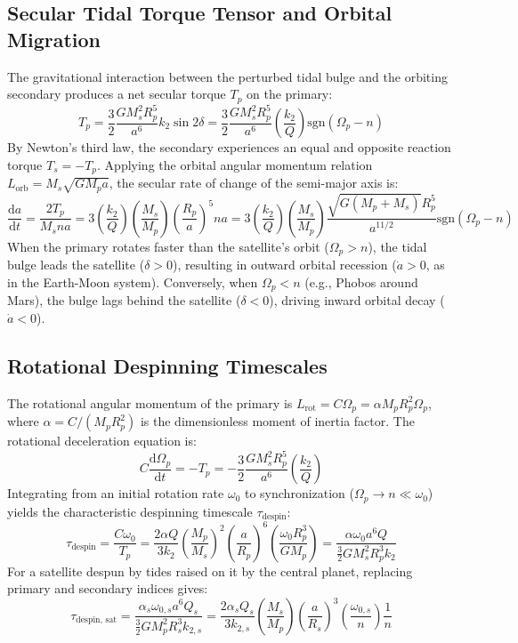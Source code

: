 \documentclass[11pt,a4paper]{article}
\begin{document}
\subsection{Secular Tidal Torque Tensor and Orbital Migration}
The gravitational interaction between the perturbed tidal bulge and the orbiting secondary produces a net secular torque $T_p$ on the primary:
\begin{equation}
T_p = \frac{3}{2} \frac{G M_s^2 R_p^5}{a^6} k_2 \sin 2\delta = \frac{3}{2} \frac{G M_s^2 R_p^5}{a^6} \left(\frac{k_2}{Q}\right) \mathrm{sgn}(\Omega_p - n)
\end{equation}
By Newton's third law, the secondary experiences an equal and opposite reaction torque $T_s = -T_p$. Applying the orbital angular momentum relation $L_{\text{orb}} = M_s \sqrt{G M_p a}$, the secular rate of change of the semi-major axis is:
\begin{equation}
\frac{\mathrm{d}a}{\mathrm{d}t} = \frac{2 T_p}{M_s n a} = 3 \left(\frac{k_2}{Q}\right) \left(\frac{M_s}{M_p}\right) \left(\frac{R_p}{a}\right)^5 n a = 3 \left(\frac{k_2}{Q}\right) \left(\frac{M_s}{M_p}\right) \frac{\sqrt{G(M_p + M_s)} R_p^5}{a^{11/2}} \mathrm{sgn}(\Omega_p - n)
\end{equation}
When the primary rotates faster than the satellite's orbit ($\Omega_p > n$), the tidal bulge leads the satellite ($\delta > 0$), resulting in outward orbital recession ($\dot{a} > 0$, as in the Earth-Moon system). Conversely, when $\Omega_p < n$ (e.g., Phobos around Mars), the bulge lags behind the satellite ($\delta < 0$), driving inward orbital decay ($\dot{a} < 0$).

\subsection{Rotational Despinning Timescales}
The rotational angular momentum of the primary is $L_{\text{rot}} = C \Omega_p = \alpha M_p R_p^2 \Omega_p$, where $\alpha = C / (M_p R_p^2)$ is the dimensionless moment of inertia factor. The rotational deceleration equation is:
\begin{equation}
C \frac{\mathrm{d}\Omega_p}{\mathrm{d}t} = - T_p = -\frac{3}{2} \frac{G M_s^2 R_p^5}{a^6} \left(\frac{k_2}{Q}\right)
\end{equation}
Integrating from an initial rotation rate $\omega_0$ to synchronization ($\Omega_p \to n \ll \omega_0$) yields the characteristic despinning timescale $\tau_{\text{despin}}$:
\begin{equation}
\tau_{\text{despin}} = \frac{C \omega_0}{T_p} = \frac{2\alpha Q}{3 k_2} \left(\frac{M_p}{M_s}\right)^2 \left(\frac{a}{R_p}\right)^6 \left(\frac{\omega_0 R_p^3}{G M_p}\right) = \frac{\alpha \omega_0 a^6 Q}{\frac{3}{2} G M_s^2 R_p^3 k_2}
\end{equation}
For a satellite despun by tides raised on it by the central planet, replacing primary and secondary indices gives:
\begin{equation}
\tau_{\text{despin, sat}} = \frac{\alpha_s \omega_{0,s} a^6 Q_s}{\frac{3}{2} G M_p^2 R_s^3 k_{2,s}} = \frac{2\alpha_s Q_s}{3 k_{2,s}} \left(\frac{M_s}{M_p}\right) \left(\frac{a}{R_s}\right)^3 \left(\frac{\omega_{0,s}}{n}\right) \frac{1}{n}
\end{equation}
\end{document}

